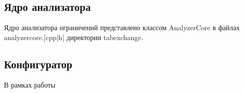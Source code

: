 \subsection{Ядро анализатора}

Ядро анализатора ограничений представлено классом AnalyzerCore в файлах 
analyzercore.[cpp|h] директории tabexchange.


\subsection{Конфигуратор}

В рамках работы 